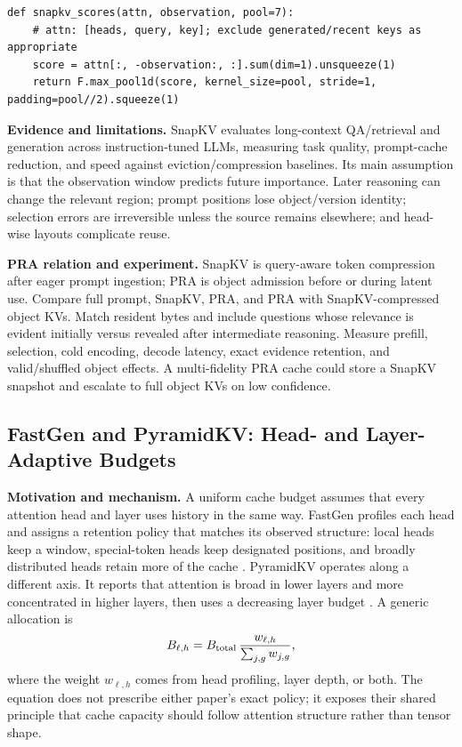 \begin{lstlisting}[caption={Observation-window prompt selection}]
def snapkv_scores(attn, observation, pool=7):
    # attn: [heads, query, key]; exclude generated/recent keys as appropriate
    score = attn[:, -observation:, :].sum(dim=1).unsqueeze(1)
    return F.max_pool1d(score, kernel_size=pool, stride=1, padding=pool//2).squeeze(1)
\end{lstlisting}

\textbf{Evidence and limitations.} SnapKV evaluates long-context QA/retrieval and generation
across instruction-tuned LLMs, measuring task quality, prompt-cache reduction, and speed
against eviction/compression baselines.  Its main assumption is that the observation window
predicts future importance.  Later reasoning can change the relevant region; prompt
positions lose object/version identity; selection errors are irreversible unless the source
remains elsewhere; and head-wise layouts complicate reuse.

\textbf{PRA relation and experiment.} SnapKV is query-aware token compression after eager
prompt ingestion; PRA is object admission before or during latent use.  Compare full prompt,
SnapKV, PRA, and PRA with SnapKV-compressed object KVs.  Match resident bytes and include
questions whose relevance is evident initially versus revealed after intermediate reasoning.
Measure prefill, selection, cold encoding, decode latency, exact evidence retention, and
valid/shuffled object effects.  A multi-fidelity PRA cache could store a SnapKV snapshot and
escalate to full object KVs on low confidence.

\subsection{FastGen and PyramidKV: Head- and Layer-Adaptive Budgets}

\textbf{Motivation and mechanism.} A uniform cache budget assumes that every attention
head and layer uses history in the same way. FastGen profiles each head and assigns a
retention policy that matches its observed structure: local heads keep a window,
special-token heads keep designated positions, and broadly distributed heads retain more
of the cache \citep{ge2023fastgen}. PyramidKV operates along a different axis. It reports
that attention is broad in lower layers and more concentrated in higher layers, then uses
a decreasing layer budget \citep{cai2024pyramidkv}. A generic allocation is
\begin{equation}
B_{\ell,h}=B_{\rm total}\,
\frac{w_{\ell,h}}{\sum_{j,g}w_{j,g}},
\end{equation}
where the weight $w_{\ell,h}$ comes from head profiling, layer depth, or both. The equation
does not prescribe either paper's exact policy; it exposes their shared principle that
cache capacity should follow attention structure rather than tensor shape.

